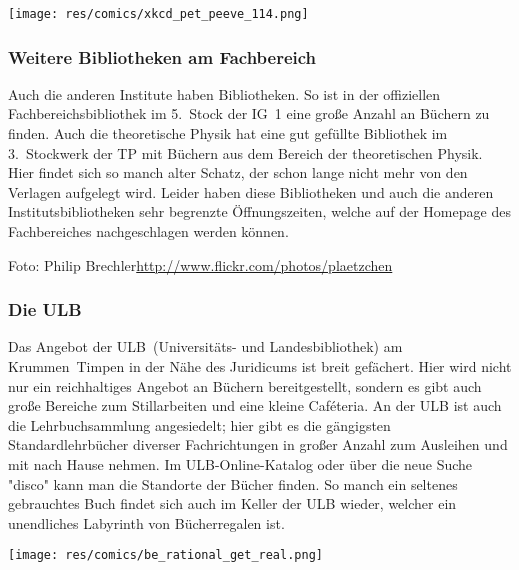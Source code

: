 \begin{multicols}{2}
\begin{center}
\texttt{[image: res/comics/xkcd\_pet\_peeve\_114.png]}
\end{center}

\subsubsection*{Weitere Bibliotheken am Fachbereich}
Auch die anderen Institute haben Bibliotheken. So ist in der offiziellen Fachbereichsbibliothek im 5.~Stock der IG~1 eine große Anzahl an Büchern zu finden. Auch die theoretische Physik hat eine gut gefüllte Bibliothek im 3.~Stockwerk der TP mit Büchern aus dem Bereich der theoretischen Physik. Hier findet sich so manch alter Schatz, der schon lange nicht mehr von den Verlagen aufgelegt wird. Leider haben diese Bibliotheken und auch die anderen Institutsbibliotheken sehr begrenzte Öffnungszeiten, welche auf der Homepage des Fachbereiches nachgeschlagen werden können.

{\scriptsize Foto: Philip Brechler\hfill\url{http://www.flickr.com/photos/plaetzchen}}

\subsubsection*{Die ULB}
Das Angebot der ULB~(Universitäts- und Landesbibliothek) am Krummen~Timpen in der Nähe des Juridicums ist breit gefächert. Hier wird nicht nur ein reichhaltiges Angebot an Büchern bereitgestellt, sondern es gibt auch große Bereiche zum Stillarbeiten und eine kleine Caféteria. An der ULB ist auch die Lehrbuchsammlung angesiedelt; hier gibt es die gängigsten Standardlehrbücher diverser Fachrichtungen in großer Anzahl zum Ausleihen und mit nach Hause nehmen. Im ULB-Online-Katalog oder über die neue Suche "disco" kann man die Standorte der Bücher finden. So manch ein seltenes gebrauchtes Buch findet sich auch im Keller der ULB wieder, welcher ein unendliches Labyrinth von Bücherregalen ist.

\texttt{[image: res/comics/be\_rational\_get\_real.png]}

\end{multicols}
